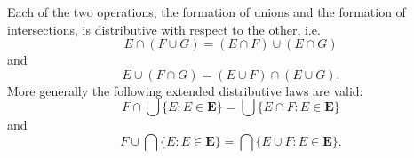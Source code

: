 Each of the two operations, the formation of unions and the formation of intersections, is distributive with respect to the other, i.e.
$$E \cap (F \cup G) = (E \cap F) \cup (E \cap G)$$
and
$$E \cup (F \cap G) = (E \cup F) \cap (E \cup G).$$
More generally the following extended distributive laws are valid:
$$F \cap \bigcup \{E: E \in \mathbf{E}\} = \bigcup \{E \cap F: E \in \mathbf{E}\}$$
and
$$F \cup \bigcap \{E: E \in \mathbf{E}\} = \bigcap \{E \cup F: E \in \mathbf{E}\}.$$
